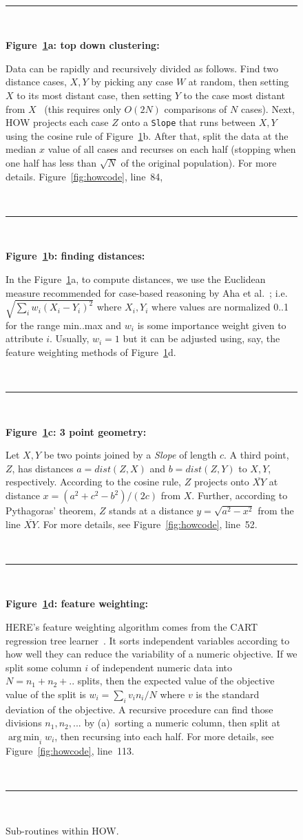 \documentclass[conference]{IEEEtran}
\newcommand{\fig}[1]{Figure~\ref{fig:#1}}
\DeclareMathOperator*{\argmin}{arg\,min}
\begin{document}
\begin{figure}[t!]
\small
~\hrule~

{\bf \fig{where}a: top down clustering:}

Data can be rapidly and recursively divided   as follows.
Find   two   distance cases,  $X,Y$
by picking any case $W$ at random, then setting $X$ to its most
distant case, then setting $Y$ to the case most distant from
$X$~\cite{fastmap}
(this requires only $O(2N)$ comparisons
of $N$ cases).
Next, HOW projects each case $Z$
onto a {\tt Slope} that  runs between $X,Y$ using the cosine
rule of \fig{where}b. After that,  split the data at the median $x$ value of all cases and
recurses on each half  (stopping when
one half has less  than $\sqrt{N}$ of the original population). For more details. \fig{howcode}, line~84, 

~\hrule~
 
{\bf \fig{where}b: finding distances:}

In the \fig{where}a, to compute distances, we use
the Euclidean measure recommended for
case-based reasoning by Aha et al.~\cite{aha91};
i.e. $\sqrt{\sum_iw_i(X_i-Y_i)^2}$ where $X_i,Y_i$
where values are  normalized 0..1 for the range min..max and 
$w_i$ is some importance weight given to attribute $i$.
Usually, $w_i=1$ but it can be adjusted using, say,
the feature weighting methods of \fig{where}d. 
 
 ~\hrule~
 
{\bf \fig{where}c: 3 point geometry:}
 
Let   $X,Y$ be two points joined by  a {\em Slope} of  length $c$.
A third point, $Z$, has distances  $a=dist(Z,X)$ and
$b=dist(Z,Y)$ to $X,Y$, respectively.
According to the cosine rule,   $Z$ projects onto  $\overline{XY}$
at distance $x=(a^2 + c^2 - b^2)/(2c)$ from $X$.
Further, according to Pythagoras' theorem, $Z$ stands at a distance
$y = \sqrt{a^2 - x^2}$ from the line $\overline{XY}$. For more details, see  \fig{howcode}, line~52.

~\hrule~

{\bf \fig{where}d: feature weighting:}

HERE's feature weighting algorithm
comes from the CART regression tree learner~\cite{Breiman1984}.
It sorts independent variables
 according to how well they can reduce the variability
of a  numeric objective.
If we split some column $i$ of independent numeric data  into $N=n_1 + n_2 + ..$ splits,
then the expected
value of the objective value of the split  is $w_i = \sum_i v_in_i/N$
where $v$ is the standard deviation of the objective.
A recursive procedure can  find those divisions $n_1,n_2,...$ by (a)~sorting a numeric column,
then split at $\argmin_i w_i$, then recursing into each half.  For more details, see  \fig{howcode}, line~113.

~\hrule~
 
\caption{Sub-routines within HOW.}\label{fig:where}
\end{figure}
\end{document}
